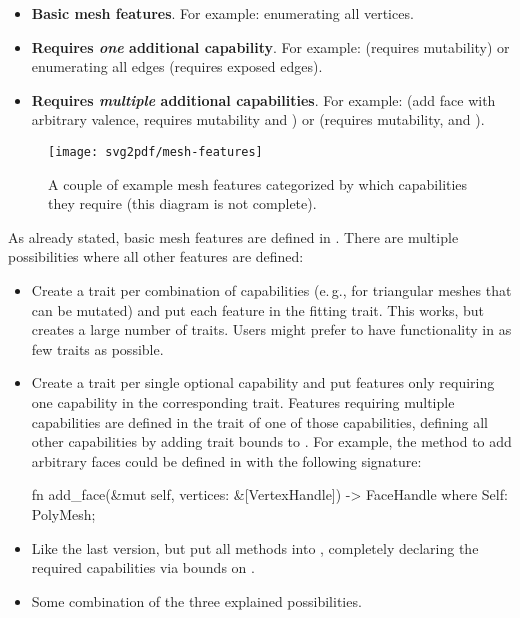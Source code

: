 \begin{itemize}
  \item \textbf{Basic mesh features}. For example: enumerating all vertices.
  \item \textbf{Requires \emph{one} additional capability}. For example:  (requires mutability) or enumerating all edges (requires exposed edges).
  \item \textbf{Requires \emph{multiple} additional capabilities}. For example:  (add face with arbitrary valence, requires mutability and ) or  (requires mutability,  and ). %
\end{itemize}

\begin{figure}[t]
  \centering
  \texttt{[image: svg2pdf/mesh-features]}
  \caption{
    A couple of example mesh features categorized by which capabilities they require (this diagram is not complete).
  }
  \label{fig:mesh-features}
\end{figure}

As already stated, basic mesh features are defined in .
There are multiple possibilities where all other features are defined:

\begin{itemize}
  \item Create a trait per combination of capabilities (e.\,g.,  for triangular meshes that can be mutated) and put each feature in the fitting trait.
  This works, but creates a large number of traits.
  Users might prefer to have functionality in as few traits as possible.
  \item Create a trait per single optional capability and put features only requiring one capability in the corresponding trait.
  Features requiring multiple capabilities are defined in the trait of one of those capabilities, defining all other capabilities by adding trait bounds to .
  For example, the method to add arbitrary faces could be defined in  with the following signature:

  \begin{rustcode}
    fn add_face(&mut self, vertices: &[VertexHandle]) -> FaceHandle
    where
        Self: PolyMesh;
  \end{rustcode}

  \item Like the last version, but put all methods into , completely declaring the required capabilities via bounds on .
  \item Some combination of the three explained possibilities.
\end{itemize}

